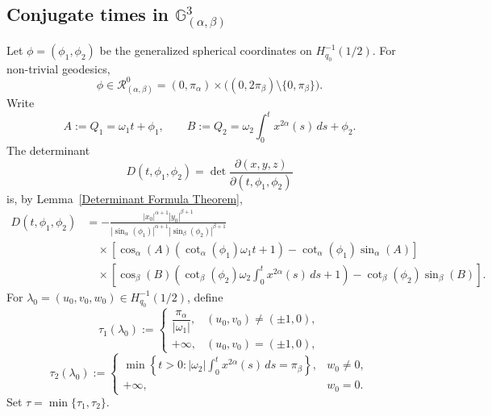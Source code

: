 \documentclass[12pt]{amsart}
\numberwithin{equation}{section}
\theoremstyle{plain}
\theoremstyle{definition}
\theoremstyle{remark}
\begin{document}
\subsection{Conjugate times in \texorpdfstring{$\mathbb G^3_{(\alpha,\beta)}$}{G3}}

Let \(\phi=(\phi_1,\phi_2)\) be the generalized spherical coordinates on
\(H_{q_0}^{-1}(1/2)\). For non-trivial geodesics,
\[
    \phi\in \mathcal R^0_{(\alpha,\beta)}
    =
    (0,\pi_\alpha)\times
    \bigl((0,2\pi_\beta)\setminus\{0,\pi_\beta\}\bigr).
\]
Write
\[
    A:=Q_1=\omega_1t+\phi_1,
    \qquad
    B:=Q_2=\omega_2\int_0^t x^{2\alpha}(s)\,ds+\phi_2.
\]
The determinant
\[
    D(t,\phi_1,\phi_2)
    =
    \det
    \frac{\partial(x,y,z)}{\partial(t,\phi_1,\phi_2)}
\]
is, by Lemma~\ref{Determinant Formula Theorem},
\begin{equation}\label{det formula 3D}
    \begin{aligned}
        D(t,\phi_1,\phi_2)
         & =
        -
        \frac{|x_0|^{\alpha+1}|y_0|^{\beta+1}}
        {|\sin_\alpha(\phi_1)|^{\alpha+1}|\sin_\beta(\phi_2)|^{\beta+1}}
        \\
         & \quad\times
        \left[
            \cos_\alpha(A)
            \left(\cot_\alpha(\phi_1)\omega_1t+1\right)
            -
            \cot_\alpha(\phi_1)\sin_\alpha(A)
            \right]
        \\
         & \quad\times
        \left[
            \cos_\beta(B)
            \left(
            \cot_\beta(\phi_2)\omega_2
            \int_0^t x^{2\alpha}(s)\,ds
            +1
            \right)
            -
            \cot_\beta(\phi_2)\sin_\beta(B)
            \right].
    \end{aligned}
\end{equation}
For \(\lambda_0=(u_0,v_0,w_0)\in H_{q_0}^{-1}(1/2)\), define
\[
    \tau_1(\lambda_0)
    :=
    \begin{cases}
        \dfrac{\pi_\alpha}{|\omega_1|},
         & (u_0,v_0)\neq(\pm1,0), \\[2mm]
        +\infty,
         & (u_0,v_0)=(\pm1,0),
    \end{cases}
\]
\[
    \tau_2(\lambda_0)
    :=
    \begin{cases}
        \min\left\{
        t>0:
        |\omega_2|\displaystyle\int_0^t x^{2\alpha}(s)\,ds=\pi_\beta
        \right\},
         & w_0\neq0, \\[3mm]
        +\infty,
         & w_0=0.
    \end{cases}
\]
Set \(\tau=\min\{\tau_1,\tau_2\}\).
\end{document}

